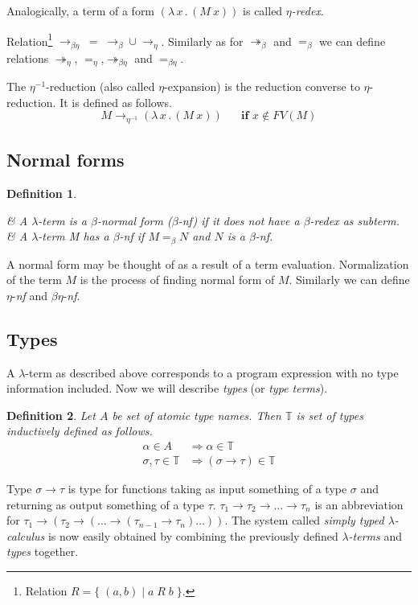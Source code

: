 \documentclass[11pt]{article}
\newtheorem{definition}{Definition}
\newcommand{\lterm}{$\lambda$-term\xspace}
\newcommand{\lterms}{$\lambda$-terms\xspace}
\newcommand{\then}{\Rightarrow\xspace}
\newcommand{\lamb}[2]{( \lambda \, #1 \, . \, #2 )}
\newcommand{\bbarr}{\twoheadrightarrow_\beta}
\newcommand{\barr}{\rightarrow_\beta}
\newcommand{\beq}{=_\beta}
\newcommand{\eearr}{\twoheadrightarrow_\eta}
\newcommand{\earr}{\rightarrow_\eta}
\newcommand{\eeq}{=_\eta}
\newcommand{\bearr}{\rightarrow_{\beta\eta}}
\newcommand{\bbeearr}{\twoheadrightarrow_{\beta\eta}}
\newcommand{\beeq}{=_{\beta\eta}}
\newcommand{\bnf}{$\beta$-\textit{nf}\xspace}
\newcommand{\enf}{$\eta$-\textit{nf}\xspace}
\newcommand{\benf}{$\beta\eta$-\textit{nf}\xspace}
\newcommand{\ar}{\rightarrow\xspace}
\newcommand{\T}{\mathbb{T}\xspace}
\newcommand{\eeArrow}{\rightarrow_{\eta^{-1}}\xspace}
\begin{document}
\begin{article}
Analogically, a term of a form $\lamb{x}{(M~x)}$ is called 
\textit{$\eta$-redex}.

Relation\footnote{Relation $R = \{\;(a,b)\;|\;a\;R\;b\;\}$.} $\bearr\;=\;\barr \cup \earr$.
Similarly as for $\bbarr$ and $\beq$ we can define relations 
$\eearr$, $\eeq$,$\bbeearr$ and $\beeq$.

The $\eta^{-1}$-reduction (also called $\eta$-expansion) is 
the reduction converse to $\eta$-reduction.
It is defined as follows.  
$$M \eeArrow \lamb{x}{(M~x)} \textbf{ ~~~~if } x \not\in FV(M) $$


\subsection{Normal forms}
\begin{definition}~

\begin{easylist}[enumerate]
& A \lterm is a \textit{$\beta$-normal form} (\bnf) 
if it does not have a $\beta$-redex as subterm.
& A \lterm M \textit{has} a \bnf if $M \beq N$
and $N$ is a \bnf.
\end{easylist}
\end{definition}

A normal form may be thought of as a result of a term evaluation. 
Normalization of the term $M$ is the process of finding normal form of $M$. 
Similarly we can define \enf and \benf.

\subsection{Types}

A \lterm as described above
corresponds to a program expression with no type information
included. Now we will describe \textit{types} (or \textit{type terms}).

\begin{definition}
Let $A$ be set of {\it atomic type names}. 
Then $\mathbb{T}$ is set of {\it types} inductively defined as follows.
\begin{align*}
\alpha      \in A  &\then   \alpha \in \T \\
\sigma,\tau \in \T &\then ( \sigma \ar  \tau ) \in \T 
\end{align*}
\end{definition}


Type $\sigma \ar \tau$ is type for functions taking as input
something of a type $\sigma$ and returning 
as output something of a type $\tau$. 
$\tau_1 \ar \tau_2 \ar \dots \ar \tau_n$ is an abbreviation for 
$\tau_1 \ar (\tau_2 \ar (\dots \ar (\tau_{n-1} \ar \tau_n)\dots))$.
The system called \textit{simply typed $\lambda$-calculus} is now easily obtained by
combining the previously defined \textit{\lterms} and \textit{types} together.


\end{article}
\end{document}
